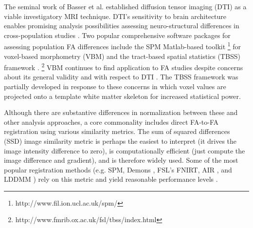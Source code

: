 \documentclass[final,5p,times,twocolumn]{elsarticle}
\begin{document}

The seminal work of Basser et al. \citep{Basser1994a,Basser1994} established diffusion tensor imaging (DTI) as a viable investigatory MRI technique.  DTI's sensitivity to brain architecture \citep{Basser1996,Assaf2008} enables promising analysis possibilities assessing neuro-structural differences in cross-population studies \citep{Kubicki2005,Arnone2008,Kantarci2010,Rametti2010}.
Two popular comprehensive software packages for assessing population FA differences include the SPM Matlab-based toolkit%
\footnote{
http://www.fil.ion.ucl.ac.uk/spm/
}
for voxel-based morphometry (VBM)
and the tract-based spatial statistics (TBSS) framework \citep{Smith2006}.%
\footnote{
http://www.fmrib.ox.ac.uk/fsl/tbss/index.html
} 
VBM \citep{Ashburner2001} continues to find application to FA studies \citep{Kakeda2010,Takao2010,Preziosa2011} despite concerns about its general validity \citep{Bookstein2001,Davatzikos2004} and with respect to DTI \citep{Jones2005,Chung2008}.  The TBSS framework was partially developed in response to these concerns in which voxel values are projected onto a template white matter skeleton for increased statistical power.  

Although there are substantive differences in normalization
between these and other analysis approaches, a core
commonality includes direct FA-to-FA registration using various similarity metrics.  The sum of squared differences (SSD) image similarity metric is perhaps the easiest to interpret (it drives the image intensity difference to zero), is computationally efficient (just compute the image difference and gradient), and is therefore widely used.  Some of the most popular registration methods (e.g. SPM, 
Demons \cite{Thirion1998}, FSL's FNIRT, AIR \citep{Woods1998}, and LDDMM \citep{Beg2005}) rely on this metric and yield reasonable performance levels \citep{Klein2009}.%
\end{document}
